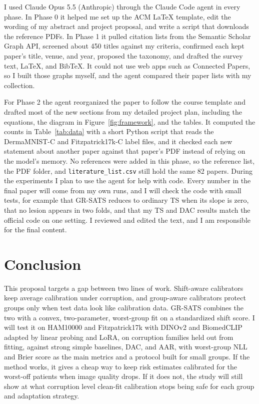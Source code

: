 \documentclass[sigconf,nonacm]{acmart}
\begin{document}
I used Claude Opus 5.5 (Anthropic) through the Claude Code agent in every phase. In Phase 0 it helped me set up the ACM LaTeX template, edit the wording of my abstract and project proposal, and write a script that downloads the reference PDFs. In Phase 1 it pulled citation lists from the Semantic Scholar Graph API, screened about 450 titles against my criteria, confirmed each kept paper's title, venue, and year, proposed the taxonomy, and drafted the survey text, LaTeX, and BibTeX. It could not use web apps such as Connected Papers, so I built those graphs myself, and the agent compared their paper lists with my collection.

For Phase 2 the agent reorganized the paper to follow the course template and drafted most of the new sections from my detailed project plan, including the equations, the diagram in Figure~\ref{fig:framework}, and the tables. It computed the counts in Table~\ref{tab:data} with a short Python script that reads the DermaMNIST-C and Fitzpatrick17k-C label files, and it checked each new statement about another paper against that paper's PDF instead of relying on the model's memory. No references were added in this phase, so the reference list, the PDF folder, and \texttt{literature\_list.csv} still hold the same 82 papers. During the experiments I plan to use the agent for help with code. Every number in the final paper will come from my own runs, and I will check the code with small tests, for example that GR-SATS reduces to ordinary TS when its slope is zero, that no lesion appears in two folds, and that my TS and DAC results match the official code on one setting. I reviewed and edited the text, and I am responsible for the final content.

\section{Conclusion}

This proposal targets a gap between two lines of work. Shift-aware calibrators keep average calibration under corruption, and group-aware calibrators protect groups only when test data look like calibration data. GR-SATS combines the two with a convex, two-parameter, worst-group fit on a standardized shift score. I will test it on HAM10000 and Fitzpatrick17k with DINOv2 and BiomedCLIP adapted by linear probing and LoRA, on corruption families held out from fitting, against strong simple baselines, DAC, and AAR, with worst-group NLL and Brier score as the main metrics and a protocol built for small groups. If the method works, it gives a cheap way to keep risk estimates calibrated for the worst-off patients when image quality drops. If it does not, the study will still show at what corruption level clean-fit calibration stops being safe for each group and adaptation strategy.



\end{document}
